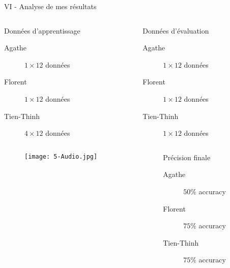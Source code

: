 \begin{frame}{VI - Analyse de mes résultats}
	\begin{columns}[T]
		\begin{column}[]{0.45\textwidth}
			\begin{exampleblock}{Données d'apprentissage}
				\begin{description}
					\item[Agathe]  $1\times12$ données
					\item[Florent]  $1\times12$ données
					\item[Tien-Thinh]  $4\times12$ données
				\end{description}
			\end{exampleblock}
		\end{column}
		\begin{column}[]{0.45\textwidth}
			\begin{alertblock}{Données d'évaluation}
				\begin{description}
					\item[Agathe]  $1\times12$ données
					\item[Florent]  $1\times12$ données
					\item[Tien-Thinh]  $1\times12$ données
				\end{description}
			\end{alertblock}
		\end{column}
	\end{columns}
	\begin{columns}[T]
		\begin{column}[]{0.45\textwidth}
			\begin{figure}
				\texttt{[image: 5-Audio.jpg]}
			\end{figure}
		\end{column}
		\begin{column}[]{0.45\textwidth}
			\begin{block}{Précision finale}
				\begin{description}
					\item[Agathe]  $50\%$ accuracy
					\item[Florent]  $75\%$ accuracy
					\item[Tien-Thinh]  $75\%$ accuracy
				\end{description}
			\end{block}
		\end{column}
	\end{columns}
\end{frame}


